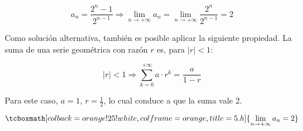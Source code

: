 \documentclass{article}
\newcommand{\hresult}[2]{\tcboxmath[colback=orange!25!white,colframe=orange, title=#1] {#2} }
\newcommand{\limninf}{\lim_{n \rightarrow +\infty}}
\begin{document}
\begin{equation}
a_n = \frac{2^n-1}{2^{n-1}} \Rightarrow \limninf a_n = \limninf \frac{2^n}{2^{n-1}} = 2
\end{equation}

Como solución alternativa, también es posible aplicar la siguiente propiedad. La suma de una serie geométrica con razón $ r $ es, para $ |r| < 1 $:

\begin{equation}
|r| < 1 \Rightarrow \sum_{k=0}^{+\infty} a \cdot r^k = \frac{a}{1-r} 
\end{equation}

Para este caso, $ a = 1 $, $ r = \frac{1}{2} $, lo cual conduce a que la suma vale 2.

\begin{equation}
\hresult{5.h}{\limninf a_n = 2}
\end{equation}
\end{document}
